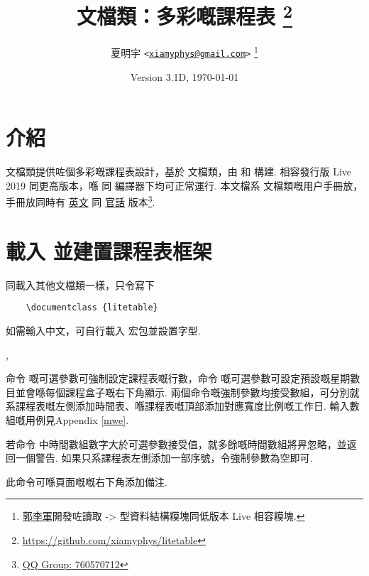 \documentclass[letterpaper]{l3doc}
\title
{
  \bfseries\cls{litetable} 文檔類：多彩嘅課程表
  \footnote{\url{https://github.com/xiamyphys/litetable}}
}
\author
{
  夏明宇 \texttt{<\href{mailto:xiamyphys@gmail.com}{xiamyphys@gmail.com}>}
  \thanks{\href{https://github.com/ljguo1020}{郭李軍}開發咗讀取 \meta{left} -> \meta{right} 型資料結構糢塊同低版本 \hologo{TeX} Live 相容糢塊.}
}
\date{Version 3.1D, \today}
\begin{document}
\maketitle

\section{介紹}

 文檔類提供咗個多彩嘅課程表設計，基於  文檔類，由  和  構建. 相容發行版  Live 2019 同更高版本，喺  同  編譯器下均可正常運行. 本文檔系  文檔類嘅用户手冊放，手冊放同時有 \href{./litetable-en.pdf}{英文} 同 \href{./litetable-cn.pdf}{官話} 版本\footnote{\href{https://qm.qq.com/q/RyssAhG4qy}{QQ Group: 760570712}}.

\section{載入  並建置課程表框架}

同載入其他文檔類一樣，只令寫下

\begin{framed}
  \begin{verbatim}
    \documentclass {litetable}
  \end{verbatim}
\end{framed}

如需輸入中文，可自行載入  宏包並設置字型.

\begin{function}{\timelist,\weeklist}
  \begin{syntax}
                    
           
  \end{syntax}

  命令  嘅可選參數可強制設定課程表嘅行數，命令  嘅可選參數可設定預設嘅星期數目並會喺每個課程盒子嘅右下角顯示. 兩個命令嘅強制參數均接受數組，可分別就系課程表嘅左側添加時間表、喺課程表嘅頂部添加對應寬度比例嘅工作日. 輸入數組嘅用例見Appendix \ref{mwe}.
  
  若命令  中時間數組數字大於可選參數接受值，就多餘嘅時間數組將畀忽略，並返回一個警告. 如果只系課程表左側添加一部序號，令強制參數為空即可.
\end{function}

\begin{function}{\more}
  \begin{syntax}
     
  \end{syntax}

  此命令可喺頁面嘅嘅右下角添加備注.
\end{function}
\end{document}
